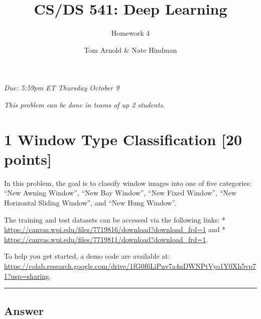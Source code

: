 \documentclass[
  letterpaper,
  DIV=11,
  numbers=noendperiod]{scrartcl}
\title{CS/DS 541: Deep Learning}
\subtitle{Homework 4}
\author{Tom Arnold \& Nate Hindman}
\date{}
\newcommand{\btwocol}{\begin{multicols}{2}}
\newcommand{\etwocol}{\end{multicols}}
\begin{document}
\maketitle



\btwocol

\emph{Due: 5:59pm ET Thursday October 9}

\emph{This problem can be done in teams of up 2 students.}

\etwocol

\section{1 Window Type Classification {[}20
points{]}}\label{window-type-classification-20-points}

In this problem, the goal is to classify window images into one of five
categories: ``New Awning Window'', ``New Bay Window'', ``New Fixed
Window'', ``New Horizontal Sliding Window'', and ``New Hung Window''.

The training and test datasets can be accessed via the following links:
* \url{https://canvas.wpi.edu/files/7719816/download?download_frd=1} and
* \url{https://canvas.wpi.edu/files/7719811/download?download_frd=1}.

To help you get started, a demo code are available at:
\url{https://colab.research.google.com/drive/1fG0f6LiPnv7a4nDWNPtVyo1Y0Xh5vp71?usp=sharing}.

\begin{center}\rule{0.5\linewidth}{0.5pt}\end{center}

\subsection{Answer}\label{answer}
\end{document}
